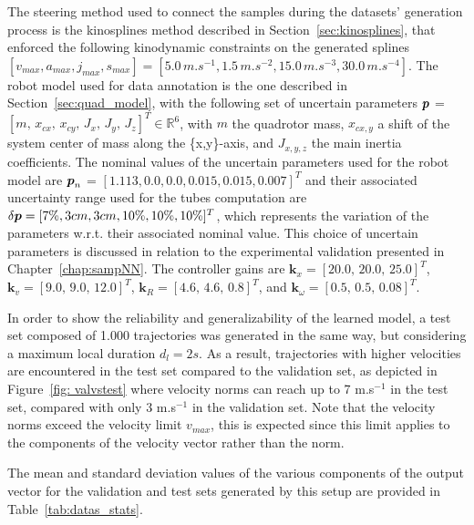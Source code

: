 The steering method used to connect the samples during the datasets' generation process is the kinosplines method described in Section~\ref{sec:kinosplines}, that enforced the following kinodynamic constraints on the generated splines $[v_{max}, a_{max}, j_{max}, s_{max}] = [5.0 \, m.s^{-1}, \allowbreak 1.5 \, m.s^{-2}, \allowbreak 15.0 \, m.s^{-3}, \allowbreak 30.0 \, m.s^{-4}]$. 
The robot model used for data annotation is the one described in Section~\ref{sec:quad_model}, with the following set of uncertain parameters $\boldsymbol{p}$ = $[m, \, \allowbreak x_{cx}, \, \allowbreak x_{cy}, \, \allowbreak J_{x}, \, \allowbreak J_{y}, \,\allowbreak J_{z}]^T \in \mathbb{R}^{6}$, with $m$ the quadrotor mass, $x_{cx,y}$ a shift of the system center of mass along the \{x,y\}-axis, and $J_{x,y,z}$ the main inertia coefficients.
The nominal values of the uncertain parameters used for the robot model are $\boldsymbol{p}_{n}$ = $[1.113, \allowbreak0.0, \allowbreak0.0, \allowbreak0.015, \allowbreak0.015, \allowbreak0.007]^T$ and their associated uncertainty range used for the tubes computation are $\delta\boldsymbol{p} = [7\%, \allowbreak3cm, \allowbreak3cm, \allowbreak10\%, \allowbreak10\%, \allowbreak10\%]^T$, which represents the variation of the parameters w.r.t. their associated nominal value.
This choice of uncertain parameters is discussed in relation to the experimental validation presented in Chapter~\ref{chap:sampNN}.
The controller gains are $\boldsymbol{k}_{x} = [20.0, \, 20.0, \, 25.0]^T$, $\boldsymbol{k}_{v}= [9.0, \, 9.0, \, 12.0]^T$, $\boldsymbol{k}_{R}=[4.6, \, 4.6, \, 0.8]^T$, and $\boldsymbol{k}_{\omega}=[0.5, \, 0.5, \, 0.08]^T$.

In order to show the reliability and generalizability of the learned model, a test set composed of 1.000 trajectories was generated in the same way, but considering a maximum local duration $d_l = 2s$.
As a result, trajectories with higher velocities are encountered in the test set compared to the validation set, as depicted in Figure~\ref{fig: valvstest} where velocity norms can reach up to 7 m.s$^{-1}$ in the test set, compared with only 3 m.s$^{-1}$ in the validation set.
Note that the velocity norms exceed the velocity limit $v_{max}$, this is expected since this limit applies to the components of the velocity vector rather than the norm.

The mean and standard deviation values of the various components of the output vector for the validation and test sets generated by this setup are provided in Table~\ref{tab:datas_stats}.

